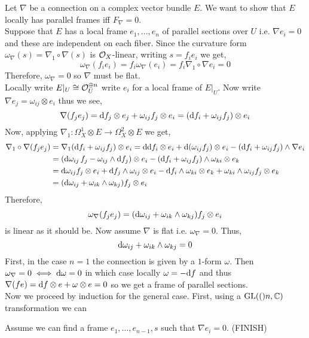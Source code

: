 \documentclass[12pt]{article}
\begin{document}
Let $\nabla$ be a connection on a complex vector bundle $E$. We want to show that $E$ locally has parallel frames iff $F_\nabla = 0$.
\bigskip\\
Suppose that $E$ has a local frame $e_1, \dots, e_n$ of parallel sections over $U$ i.e. $\nabla e_i = 0$ and these are independent on each fiber. Since the curvature form $\omega_\nabla(s) = \nabla_1 \circ \nabla(s)$ is $\mathcal{O}_{X}$-linear, writing $s = f_i e_i$ we get, 
\[ \omega_\nabla(f_i e_i) = f_i \omega_\nabla(e_i) = f_i \nabla_1 \circ \nabla e_i = 0 \]
Therefore, $\omega_\nabla = 0$ so $\nabla$ must be flat.
\bigskip\\
Locally write $E|_U \cong \mathcal{O}_{U}^{\oplus n}$ write $e_i$ for a local frame of $E|_U$. Now write $\nabla e_j = \omega_{ij} \otimes e_i$ thus we see,
\[ \nabla (f_j e_j) = \mathrm{d}{f_j} \otimes e_j + \omega_{ij} f_j \otimes e_i = ( \mathrm{d}{f_i} + \omega_{ij} f_j) \otimes e_i \] 
Now, applying $\nabla_1 : \Omega^1_X \otimes E \to \Omega^2_X \otimes E$ we get,
\begin{align*}
\nabla_1 \circ \nabla (f_j e_j) & = \nabla_1 (\mathrm{d}{f_i} + \omega_{ij} f_j) \otimes e_i = \mathrm{d}{\mathrm{d}{f_i}} \otimes e_i + \mathrm{d}{(\omega_{ij} f_j)} \otimes e_i - (\mathrm{d}{f_i} + \omega_{ij} f_j) \wedge \nabla e_i 
\\
& = (\mathrm{d}{\omega_{ij}} \, f_j - \omega_{ij} \wedge \mathrm{d}{f_j}) \otimes e_i - (\mathrm{d}{f_i} + \omega_{ij} f_j) \wedge \omega_{ki} \otimes e_k
\\
& = \mathrm{d}{\omega_{ij}} f_j \otimes e_i + \mathrm{d}{f_j} \wedge \omega_{ij} \otimes e_i - \mathrm{d}{f_i} \wedge \omega_{ki} \otimes e_k + \omega_{ki} \wedge \omega_{ij} f_j \otimes e_k
\\
& = (\mathrm{d}{\omega_{ij}} + \omega_{ik} \wedge \omega_{kj}) f_j \otimes e_i
\end{align*}
Therefore,
\[ \omega_\nabla(f_j e_j) = (\mathrm{d}{\omega_{ij}} + \omega_{ik} \wedge \omega_{kj}) f_j \otimes e_i \]
is linear as it should be. Now assume $\nabla$ is flat i.e. $\omega_\nabla = 0$. Thus,
\[ \mathrm{d}{\omega_{ij}} + \omega_{ik} \wedge \omega_{kj} = 0 \] 
First, in the case $n = 1$ the connection is given by a $1$-form $\omega$. Then $\omega_\nabla = 0 \iff \mathrm{d}{\omega} = 0$ in which case locally $\omega = - \mathrm{d}{f}$ and thus $\nabla (fe) = \mathrm{d}{f} \otimes e + \omega \otimes e = 0$ so we get a frame of parallel sections.
\bigskip\\
Now we proceed by induction for the general case. First, using a $\mathrm{GL}(()n, \mathbb{C})$ transformation we can 

  Assume we can find a frame $e_1, \dots, e_{n-1}, s$ such that $\nabla e_i = 0$. (FINISH) 
\end{document}
